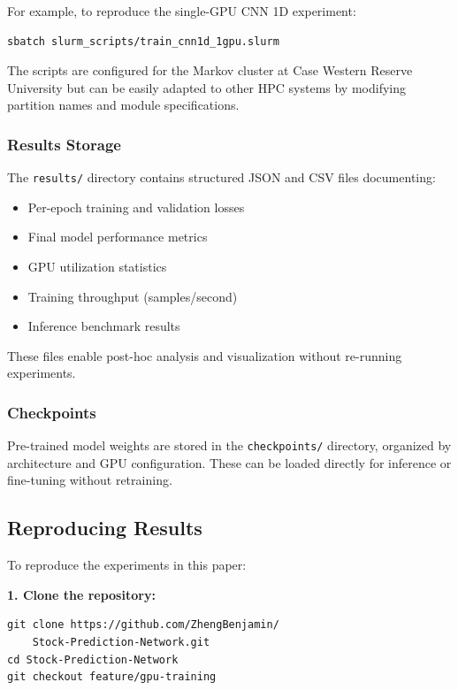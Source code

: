 \documentclass[sigconf]{acmart}
\begin{document}
For example, to reproduce the single-GPU CNN 1D experiment:
\begin{verbatim}
sbatch slurm_scripts/train_cnn1d_1gpu.slurm
\end{verbatim}

The scripts are configured for the Markov cluster at Case Western Reserve University but can be easily adapted to other HPC systems by modifying partition names and module specifications.

\subsubsection{Results Storage}

The \texttt{results/} directory contains structured JSON and CSV files documenting:
\begin{itemize}
  \item Per-epoch training and validation losses
  \item Final model performance metrics
  \item GPU utilization statistics
  \item Training throughput (samples/second)
  \item Inference benchmark results
\end{itemize}

These files enable post-hoc analysis and visualization without re-running experiments.

\subsubsection{Checkpoints}

Pre-trained model weights are stored in the \texttt{checkpoints/} directory, organized by architecture and GPU configuration. These can be loaded directly for inference or fine-tuning without retraining.

\subsection{Reproducing Results}

To reproduce the experiments in this paper:

\textbf{1. Clone the repository:}
\begin{verbatim}
git clone https://github.com/ZhengBenjamin/
    Stock-Prediction-Network.git
cd Stock-Prediction-Network
git checkout feature/gpu-training
\end{verbatim}
\end{document}
